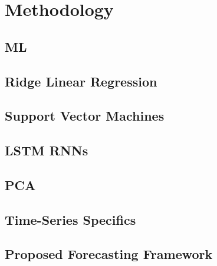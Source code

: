\chapter{Methodology}
\label{chap:four}

\section{\acl{ML}}

\section{Ridge Linear Regression}

\section{Support Vector Machines}

\section{\acl{LSTM} \acl{RNN}s}

\section{\acl{PCA}}

\section{Time-Series Specifics}
\section{Proposed Forecasting Framework}


